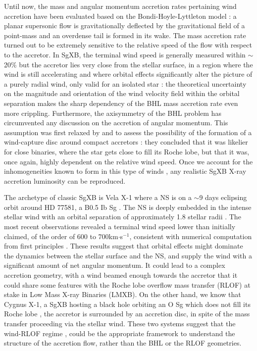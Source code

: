 \documentclass{aa}
\makeatletter
\newcommand{\sgx}{SgXB\xspace}
\newcommand*{\lmxb}{LMXB\@\xspace}
\newcommand*{\rlof}{RLOF\@\xspace}
\newcommand*{\ns}{NS\@\xspace}
\makeatother
\begin{document}
Until now, the mass and angular momentum accretion rates pertaining wind accretion have been evaluated based on the Bondi-Hoyle-Lyttleton model \citep[BHL, see][for a review]{Edgar:2004ip} : a planar supersonic flow is gravitationally deflected by the gravitational field of a point-mass and an overdense tail is formed in its wake. The mass accretion rate turned out to be extremely sensitive to the relative speed of the flow with respect to the accretor. In \sgx, the terminal wind speed is generally measured within $\sim$20\% but the accretor lies very close from the stellar surface, in a region where the wind is still accelerating and where orbital effects significantly alter the picture of a purely radial wind, only valid for an isolated star : the theoretical uncertainty on the magnitude and orientation of the wind velocity field within the orbital separation makes the sharp dependency of the BHL mass accretion rate even more crippling. Furthermore, the axisymmetry of the BHL problem has circumvented any discussion on the accretion of angular momentum. This assumption was first relaxed by \cite{Illarionov1975} and \cite{Shapiro1976} to assess the possibility of the formation of a wind-capture disc around compact accretors : they concluded that it was likelier for close binaries, where the star gets close to fill its Roche lobe, but that it was, once again, highly dependent on the relative wind speed. Once we account for the inhomogeneities known to form in this type of winds \citep{Sundqvist2017}, any realistic \sgx X-ray accretion luminosity can be reproduced.

The archetype of classic \sgx is Vela X-1 where a \ns is on a $\sim$9 days eclipsing orbit around HD 77581, a B0.5 Ib Sg \citep{Hiltner1972,Forman1973}. The \ns is deeply embedded in the intense stellar wind \citep[associated to a mass loss rate of $\sim$1.3$\cdot$10$^{-6}$M$_{\odot}$yr$^{-1}$][]{Gimenez-Garcia2016} with an orbital separation of approximately 1.8 stellar radii \citep{Quaintrell2003a}. The most recent observations revealed a terminal wind speed lower than initially claimed, of the order of 600 to 700km$\cdot$s$^{-1}$, consistent with numerical computation from first principles \citep{Sander2017}. These results suggest that orbital effects might dominate the dynamics between the stellar surface and the \ns, and supply the wind with a significant amount of net angular momentum. It could lead to a complex accretion geometry, with a wind beamed enough towards the accretor that it could share some features with the Roche lobe overflow mass transfer (\rlof) at stake in Low Mass X-ray Binaries (\lmxb). On the other hand, we know that Cygnus X-1, a \sgx hosting a black hole orbiting an O Sg which does not fill its Roche lobe \citep{Orosz2011}, the accretor is surrounded by an accretion disc, in spite of the mass transfer proceeding via the stellar wind. These two systems suggest that the wind-\rlof regime \citep[first studied in the context of symbiotic binaries by][]{Mohamed2007}, could be the appropriate framework to understand the structure of the accretion flow, rather than the BHL or the \rlof geometries.
\end{document}

